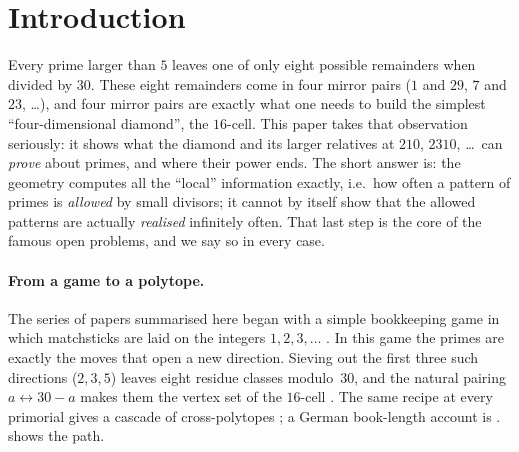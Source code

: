 \documentclass[11pt,a4paper]{article}
\theoremstyle{plain}
\theoremstyle{definition}
\theoremstyle{remark}
\begin{document}
\setcounter{tocdepth}{1}
\tableofcontents

\section*{Introduction}

\begin{plainwords}
Every prime larger than $5$ leaves one of only eight possible remainders when
divided by $30$. These eight remainders come in four mirror pairs ($1$ and
$29$, $7$ and $23$, \dots), and four mirror pairs are exactly what one needs to
build the simplest ``four-dimensional diamond'', the $16$-cell. This paper
takes that observation seriously: it shows what the diamond and its larger
relatives at $210$, $2310$, \dots\ can \emph{prove} about primes, and where
their power ends. The short answer is: the geometry computes all the
``local'' information exactly, i.e.\ how often a pattern of primes is
\emph{allowed} by small divisors; it cannot by itself show that the allowed
patterns are actually \emph{realised} infinitely often. That last step is the
core of the famous open problems, and we say so in every case.
\end{plainwords}

\paragraph{From a game to a polytope.}
The series of papers summarised here began with a simple bookkeeping game in
which matchsticks are laid on the integers $1,2,3,\dots$
\cite{K-matchstick}. In this game the primes are exactly the moves that open a
new direction. Sieving out the first three such directions ($2,3,5$) leaves
eight residue classes modulo~$30$, and the natural pairing $a\leftrightarrow
30-a$ makes them the vertex set of the $16$-cell \cite{K-16cell}. The same
recipe at every primorial gives a cascade of cross-polytopes
\cite{K-recursive,K-foundations}; a German book-length account is \cite{K-book}.  shows the path.
\end{document}
